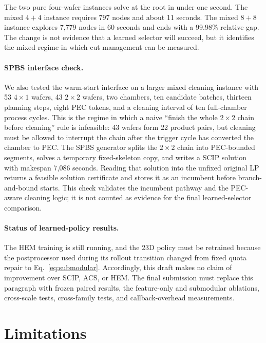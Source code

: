 \documentclass[letterpaper]{article}
\begin{document}
The two pure four-wafer instances solve at the root in under one second.
The mixed $4+4$ instance requires 797 nodes and about 11 seconds.
The mixed $8+8$ instance explores 7,779 nodes in 60 seconds and ends with a 99.98\% relative gap.
The change is not evidence that a learned selector will succeed, but it identifies the mixed regime in which cut management can be measured.

\paragraph{SPBS interface check.}
We also tested the warm-start interface on a larger mixed cleaning instance with 53 $4\times1$ wafers, 43 $2\times2$ wafers, two chambers, ten candidate batches, thirteen planning steps, eight PEC tokens, and a cleaning interval of ten full-chamber process cycles.
This is the regime in which a naive ``finish the whole $2\times2$ chain before cleaning'' rule is infeasible: 43 wafers form 22 product pairs, but cleaning must be allowed to interrupt the chain after the trigger cycle has converted the chamber to PEC.
The SPBS generator splits the $2\times2$ chain into PEC-bounded segments, solves a temporary fixed-skeleton copy, and writes a SCIP solution with makespan 7,086 seconds.
Reading that solution into the unfixed original LP returns a feasible solution certificate and stores it as an incumbent before branch-and-bound starts.
This check validates the incumbent pathway and the PEC-aware cleaning logic; it is not counted as evidence for the final learned-selector comparison.

\paragraph{Status of learned-policy results.}
The HEM training is still running, and the 23D policy must be retrained because the postprocessor used during its rollout transition changed from fixed quota repair to Eq.~\eqref{eq:submodular}.
Accordingly, this draft makes no claim of improvement over SCIP, ACS, or HEM.
The final submission must replace this paragraph with frozen paired results, the feature-only and submodular ablations, cross-scale tests, cross-family tests, and callback-overhead measurements.

\section{Limitations}
\end{document}
